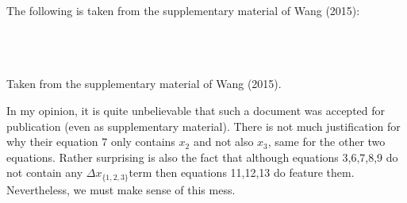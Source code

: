 The following is taken from the supplementary material of Wang \etal (2015):
\begin{center}
\\
\\
\\
{\captionfont Taken from the supplementary material of Wang \etal (2015).}
\end{center}
In my opinion, it is quite unbelievable that such a document was accepted for publication
(even as supplementary material). 
There is not much justification for why their equation 7 only contains $x_2$ and not also 
$x_3$, same for the other two equations. 
Rather surprising is also the fact that although equations 3,6,7,8,9 do not contain 
any $\Delta x_{\{1,2,3\}}$term  then equations 11,12,13 do feature them. 
Nevertheless, we must make sense of this mess. 

